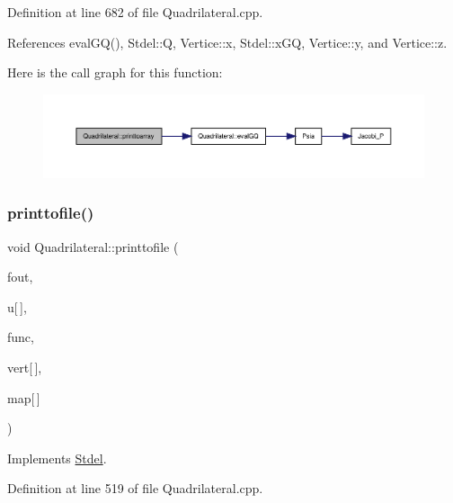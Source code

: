Definition at line 682 of file Quadrilateral.\+cpp.



References eval\+G\+Q(), Stdel\+::Q, Vertice\+::x, Stdel\+::x\+GQ, Vertice\+::y, and Vertice\+::z.

Here is the call graph for this function\+:
\nopagebreak
\begin{figure}[H]
\begin{center}
\leavevmode
\includegraphics[width=350pt]{classQuadrilateral_a3de7333817e484c45fd98982e69e0a70_cgraph}
\end{center}
\end{figure}
\mbox{\label{classQuadrilateral_af2a943c2b5b073fde641ce93b70f95b4}} 
\subsubsection{\texorpdfstring{printtofile()}{printtofile()}\hspace{0.1cm}{\footnotesize\ttfamily [1/2]}}
{\footnotesize\ttfamily void Quadrilateral\+::printtofile (\begin{DoxyParamCaption}\item[{F\+I\+LE $\ast$}]{fout,  }\item[{const double}]{u\mbox{[}$\,$\mbox{]},  }\item[{double($\ast$)(double, double, double)}]{func,  }\item[{const \hyperlink{structVertice}{Vertice}}]{vert\mbox{[}$\,$\mbox{]},  }\item[{const int}]{map\mbox{[}$\,$\mbox{]} }\end{DoxyParamCaption})\hspace{0.3cm}{\ttfamily [virtual]}}



Implements \hyperlink{classStdel_a315869f4c1fe1fdf4911c0d4ab092176}{Stdel}.



Definition at line 519 of file Quadrilateral.\+cpp.



